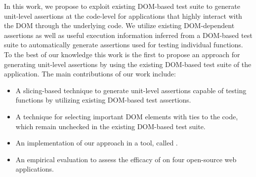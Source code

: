In this work, we propose to exploit existing DOM-based test suite to generate unit-level assertions at the \javascript code-level for applications that highly interact with the DOM through the underlying \javascript code. We utilize
existing DOM-dependent assertions as well as useful execution information inferred from a DOM-based test suite to automatically generate assertions used for testing individual \javascript functions. To the best of our knowledge this work is the first to propose an approach for generating unit-level assertions by using the existing DOM-based test suite of the application. The main contributions of our work include:
\begin{itemize}[noitemsep]
\item A slicing-based technique to generate unit-level assertions capable of testing \javascript functions by utilizing existing DOM-based test assertions.
\item A technique for selecting important DOM elements with ties to the \javascript code, which remain unchecked in the existing DOM-based test suite.
\item An implementation of our approach in a tool, called \tool. 
\item An empirical evaluation to assess the efficacy of \tool on four open-source web applications.
\end{itemize}







